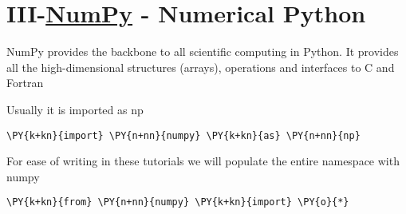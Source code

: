 






    
    \section{III-\href{http://www.numpy.org/}{NumPy} - Numerical
Python}\label{iii-numpy---numerical-python}

    NumPy provides the backbone to all scientific computing in Python. It
provides all the high-dimensional structures (arrays), operations and
interfaces to C and Fortran

    Usually it is imported as np


{\par%
\vspace{-1\baselineskip}%
}%
\begin{notebookcell}[1]%
\begin{addmargin}[\cellleftmargin]{0em}%
{\smaller%
\par%
%
\vspace{-1\smallerfontscale}%
\begin{Verbatim}[commandchars=\\\{\}]
\PY{k+kn}{import} \PY{n+nn}{numpy} \PY{k+kn}{as} \PY{n+nn}{np}
\end{Verbatim}
%
\par%
\vspace{-1\smallerfontscale}}%
\end{addmargin}
\end{notebookcell}


    For ease of writing in these tutorials we will populate the entire
namespace with numpy


{\par%
\vspace{-1\baselineskip}%
}%
\begin{notebookcell}[2]%
\begin{addmargin}[\cellleftmargin]{0em}%
{\smaller%
\par%
%
\vspace{-1\smallerfontscale}%
\begin{Verbatim}[commandchars=\\\{\}]
\PY{k+kn}{from} \PY{n+nn}{numpy} \PY{k+kn}{import} \PY{o}{*}
\end{Verbatim}
%
\par%
\vspace{-1\smallerfontscale}}%
\end{addmargin}
\end{notebookcell}


